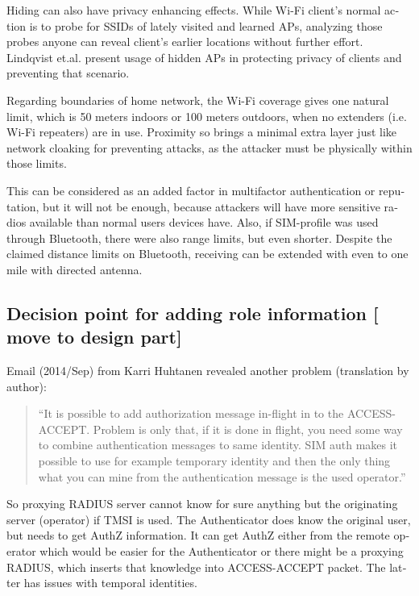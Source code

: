 \documentclass[12pt,a4paper,english]{tutthesis}
\begin{document}
\begin{otherlanguage}{english}
 Hiding can also have privacy enhancing effects.
While Wi-Fi client's normal action is to probe for SSIDs of lately visited
and learned APs, analyzing those probes anyone can reveal client's earlier
locations without further effort.
Lindqvist et.al.\cite{hidden-wlan} present usage of hidden
APs in protecting privacy of clients and preventing that scenario.



Regarding boundaries of home network, the Wi-Fi coverage gives 
one natural limit, which is 50 meters indoors or 100 meters outdoors,
when no extenders (i.e. Wi-Fi repeaters) are in use.
Proximity so brings a minimal extra layer just like network cloaking 
for preventing attacks, as the attacker must be physically within those limits.


This can be considered as an added factor in multifactor
authentication or reputation, but it will not be enough, because
attackers will have more sensitive  radios available than normal users
devices have. 
Also, if SIM-profile was used through Bluetooth, there were also
range limits, but even shorter. Despite the claimed distance limits
on Bluetooth, receiving can be extended with even to one mile with
directed antenna\cite{SANS-bluetooth-2007}.


\subsection{Decision point for adding role information [ move to design part]}
\label{sec-6-4-8}













Email (2014/Sep) from Karri Huhtanen revealed another
problem (translation by author):
\begin{quote}
``It is possible to add authorization message in-flight in to the
ACCESS-ACCEPT.
Problem is only that, if it is done in flight, you need some way to
combine authentication messages to same identity. SIM auth makes it
possible to use for example temporary identity and then the only thing
what you can mine from the authentication message is the used operator.''
\end{quote}

So proxying RADIUS server cannot know for sure anything but the
originating server (operator) if TMSI is used. The Authenticator does
know the original user, but needs to get AuthZ information. It can get
AuthZ either from the remote operator which would be easier for the
Authenticator or there might be a proxying RADIUS, which inserts that
knowledge into ACCESS-ACCEPT packet. The latter has issues with
temporal identities. 







\end{otherlanguage}
\end{document}
